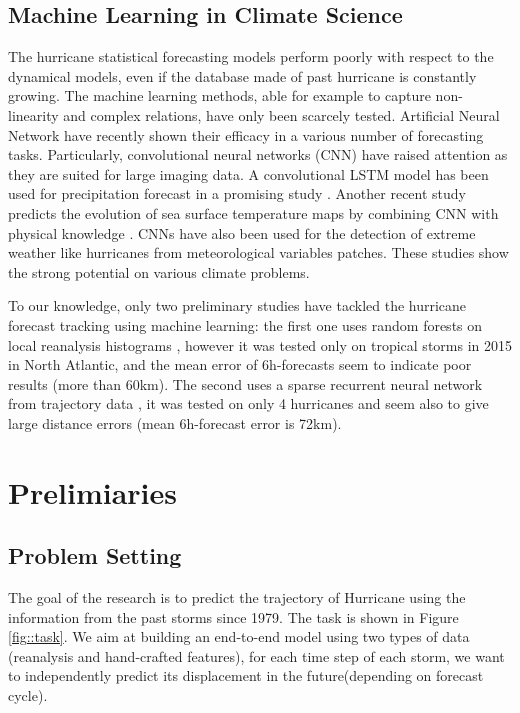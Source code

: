 \section{Machine Learning in Climate Science}

The hurricane statistical forecasting models perform poorly with respect to the dynamical models, even if the database made of past hurricane is constantly growing. The machine learning methods, able for example to capture non-linearity and complex relations, have only been scarcely tested. Artificial Neural Network have recently shown their efficacy in a various number of forecasting tasks. Particularly, convolutional neural networks (CNN) have raised attention as they are suited for large imaging data. A convolutional LSTM model has been used for precipitation forecast in a promising study \cite{xingjian2015convolutional}. Another recent study predicts the evolution of sea surface temperature maps by combining CNN with physical knowledge \cite{de2017deep}. CNNs have also been used for the detection of extreme weather like hurricanes from meteorological variables patches\cite{racah2017extremeweather}. These studies show the strong potential on various climate problems. 

To our knowledge, only two preliminary studies have tackled the hurricane forecast tracking using machine learning: the first one uses random forests on local reanalysis histograms \cite{liberge2011prevision}, however it was tested only on tropical storms in 2015 in North Atlantic, and the mean error of 6h-forecasts seem to indicate poor results (more than 60km). The second uses a sparse recurrent neural network from trajectory data \cite{moradi2016sparse}, it was tested on only 4 hurricanes and seem also to give large distance errors (mean 6h-forecast error is 72km). 


\chapter{Prelimiaries}

\section{Problem Setting}
The goal of the research is to predict the trajectory of Hurricane using the information from the past storms since 1979. The task is shown in Figure \ref{fig::task}. We aim at building an end-to-end model using two types of data (reanalysis and hand-crafted features), for each time step of each storm, we want to independently predict its displacement in the future(depending on forecast cycle). 

